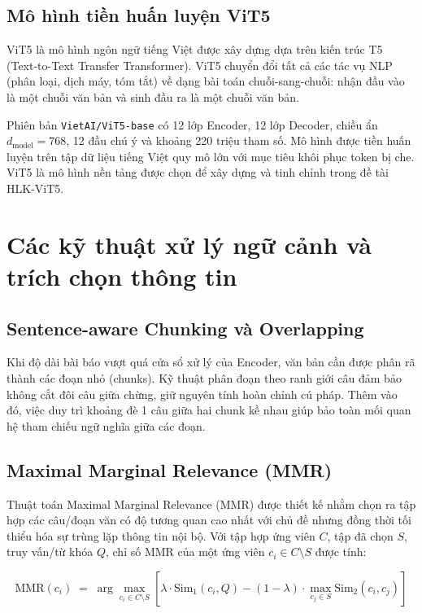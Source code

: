 \subsection{Mô hình tiền huấn luyện ViT5}

ViT5 \cite{Nguyen2022} là mô hình ngôn ngữ tiếng Việt được xây dựng dựa trên kiến trúc T5 (Text-to-Text Transfer Transformer). ViT5 chuyển đổi tất cả các tác vụ NLP (phân loại, dịch máy, tóm tắt) về dạng bài toán chuỗi-sang-chuỗi: nhận đầu vào là một chuỗi văn bản và sinh đầu ra là một chuỗi văn bản.

Phiên bản \texttt{VietAI/ViT5-base} có 12 lớp Encoder, 12 lớp Decoder, chiều ẩn $d_{\text{model}} = 768$, 12 đầu chú ý và khoảng 220 triệu tham số. Mô hình được tiền huấn luyện trên tập dữ liệu tiếng Việt quy mô lớn với mục tiêu khôi phục token bị che. ViT5 là mô hình nền tảng được chọn để xây dựng và tinh chỉnh trong đề tài HLK-ViT5.

\section{Các kỹ thuật xử lý ngữ cảnh và trích chọn thông tin}

\subsection{Sentence-aware Chunking và Overlapping}

Khi độ dài bài báo vượt quá cửa sổ xử lý của Encoder, văn bản cần được phân rã thành các đoạn nhỏ (chunks). Kỹ thuật phân đoạn theo ranh giới câu đảm bảo không cắt đôi câu giữa chừng, giữ nguyên tính hoàn chỉnh cú pháp. Thêm vào đó, việc duy trì khoảng đè 1 câu giữa hai chunk kề nhau giúp bảo toàn mối quan hệ tham chiếu ngữ nghĩa giữa các đoạn.

\subsection{Maximal Marginal Relevance (MMR)}

Thuật toán Maximal Marginal Relevance (MMR) được thiết kế nhằm chọn ra tập hợp các câu/đoạn văn có độ tương quan cao nhất với chủ đề nhưng đồng thời tối thiểu hóa sự trùng lặp thông tin nội bộ. Với tập hợp ứng viên $C$, tập đã chọn $S$, truy vấn/từ khóa $Q$, chỉ số MMR của một ứng viên $c_i \in C \setminus S$ được tính:

\[
\text{MMR}(c_i) \;=\; \arg\max_{c_i \in C \setminus S} \left[ \lambda \cdot \text{Sim}_1(c_i, Q) - (1 - \lambda) \cdot \max_{c_j \in S} \text{Sim}_2(c_i, c_j) \right]
\]

